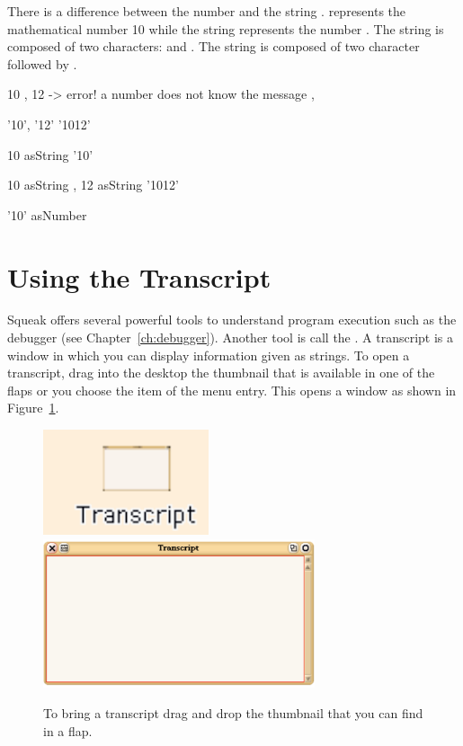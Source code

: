 
There is a difference between the number  and the string .   represents the mathematical number 10 while the string  represents the number . The string  is composed of two characters:  and . The string  is composed of two character  followed by .

\begin{nalltt}
10 , 12 
-> error! a number does not know the message ,

'10', '12'
\pr '1012'

10 asString
\pr '10'

10 asString , 12 asString
\pr '1012'

'10' asNumber
\end{nalltt}


\section{Using the Transcript}
Squeak offers several powerful tools to understand program execution such as the debugger (see Chapter~\ref{ch:debugger}). Another tool is call the . A transcript is a window in which you can display information given as strings. To open a transcript, drag into the desktop the thumbnail that is available in one of the flaps or you choose the  item of the  menu entry. This opens a window as shown in Figure~\ref{fig:transcript}.

\begin{figure}[h]
\begin{center}
\includegraphics{TranscriptThumbnail}\hfill\includegraphics[width=8cm]{Transcript}
\caption{To bring a transcript drag and drop the thumbnail that you can find in a flap.}
\label{fig:transcript}
\end{center}
\end{figure}

